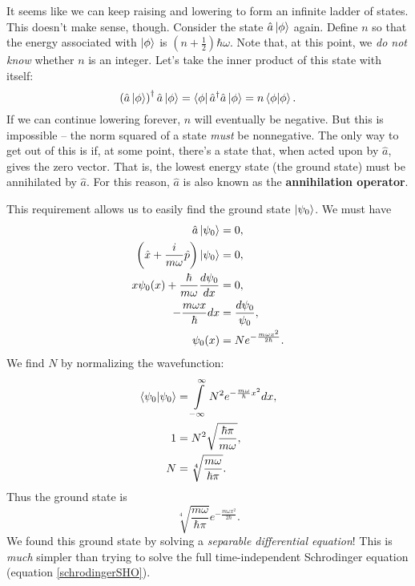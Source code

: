It seems like we can keep raising and lowering to form an infinite ladder of states. This doesn't make sense, though. 
Consider the state $\hat{a} \left| \phi \right\rangle$ again. Define $n$ so that the energy associated with $\left| \phi \right\rangle$ is $\left(n+\frac{1}{2} \right) \hbar\omega$. Note that, at this point, we \textit{do not know} whether $n$ is an integer. Let's take the inner product of this state with itself:
\begin{equation}
\left( \hat{a} \left| \phi \right\rangle \right)^\dagger \hat{a}\left| \phi \right\rangle = \left\langle \phi \right| \hat{a}^\dagger \hat{a} \left| \phi \right\rangle  = n \left\langle \phi \middle| \phi \right\rangle.
\end{equation}
If we can continue lowering forever, $n$ will eventually be negative. But this is impossible – the norm squared of a state \textit{must} be nonnegative. The only way to get out of this is if, at some point, there's a state that, when acted upon by $\hat{a}$, gives the zero vector. That is, the lowest energy state (the ground state) must be annihilated by $\hat{a}$. For this reason, $\hat{a}$ is also known as the \textbf{annihilation operator}. 

This requirement allows us to easily find the ground state $\left| \psi_0 \right\rangle$. We must have 
\begin{align*}
\hat{a} \left| \psi_0 \right\rangle &= 0,  \\
\left(\hat{x}+\frac{i}{m\omega}\hat{p} \right) \left| \psi_0 \right\rangle &= 0,  \\
x  \psi_0 (x) + \frac{\hbar}{m\omega} \frac{d\psi_0}{dx} &= 0,  \\ 
-\frac{m\omega x}{\hbar} dx&= \frac{d\psi_0}{\psi_0},  \\
\psi_0 (x) &= Ne^{-\frac{m\omega x^2}{2\hbar}}.
\end{align*}
We find $N$ by normalizing the wavefunction:
\begin{align*}
\left\langle \psi_0 \middle| \psi_0 \right\rangle &= \int\limits_{-\infty}^{\infty} N^2 e^{-\frac{m\omega}{\hbar}x^2} dx, \\
1 &= N^2 \sqrt{\frac{\hbar \pi}{m\omega}},\\
N &= \sqrt[4]{\frac{m\omega}{\hbar\pi}}.
\end{align*}
Thus the ground state is 
\begin{equation}
\sqrt[4]{\frac{m\omega}{\hbar\pi}} e^{-\frac{m\omega x^2}{2\hbar}}. \label{SHOgroundstate}
\end{equation}
We found this ground state by solving a \textit{separable differential equation}! This is \textit{much} simpler than trying to solve the full time-independent Schrodinger equation (equation \ref{schrodingerSHO}). 

